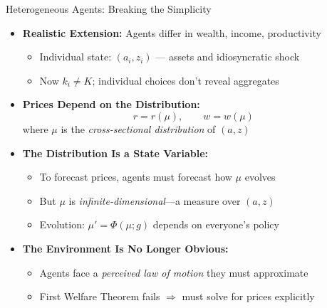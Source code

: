 \begin{frame}{Heterogeneous Agents: Breaking the Simplicity}
\begin{itemize}
\item \textbf{Realistic Extension:} Agents differ in wealth, income, productivity
\begin{itemize}
    \item Individual state: $(a_i, z_i)$ --- assets and idiosyncratic shock
    \item Now $k_i \neq K$; individual choices don't reveal aggregates
\end{itemize}

\medskip
\item \textbf{Prices Depend on the Distribution:}
\[
r = r(\mu), \qquad w = w(\mu)
\]
where $\mu$ is the \emph{cross-sectional distribution} of $(a, z)$

\medskip
\item \textbf{The Distribution Is a State Variable:}
\begin{itemize}
    \item To forecast prices, agents must forecast how $\mu$ evolves
    \item But $\mu$ is \emph{infinite-dimensional}---a measure over $(a, z)$
    \item Evolution: $\mu' = \Phi(\mu; g)$ depends on everyone's policy
\end{itemize}

\medskip
\item \textbf{The Environment Is No Longer Obvious:}
\begin{itemize}
    \item Agents face a \emph{perceived law of motion} they must approximate
    \item First Welfare Theorem fails $\Rightarrow$ must solve for prices explicitly
\end{itemize}
\end{itemize}
\end{frame}

